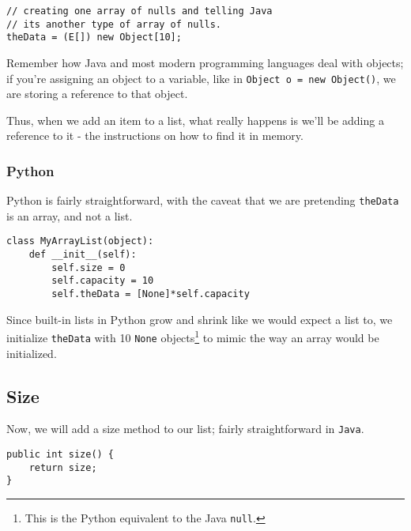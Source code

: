 \begin{verbatim}
// creating one array of nulls and telling Java 
// its another type of array of nulls. 
theData = (E[]) new Object[10];
\end{verbatim}



Remember how Java and most modern programming languages deal with objects; if you're assigning an object to a variable, like in \texttt{Object o = new Object()}, we are storing a reference to that object.

Thus, when we add an item to a list, what really happens is we'll be adding a reference to it - the instructions on how to find it in memory.
\subsubsection{Python}
Python is fairly straightforward, with the caveat that we are pretending \texttt{theData} is an array, and not a list.

\begin{verbatim}
class MyArrayList(object):
	def __init__(self):
		self.size = 0
		self.capacity = 10
		self.theData = [None]*self.capacity
\end{verbatim}

Since built-in lists in Python grow and shrink like we would expect a list to, we initialize \texttt{theData} with 10 \texttt{None} objects\footnote{This is the Python equivalent to the Java \texttt{null}.} to mimic the way an array would be initialized.


%
%
%

\subsection{Size}
Now, we will add a size method to our list; fairly straightforward in \texttt{Java}.

\begin{verbatim}
public int size() {  
	return size;
}
\end{verbatim}

